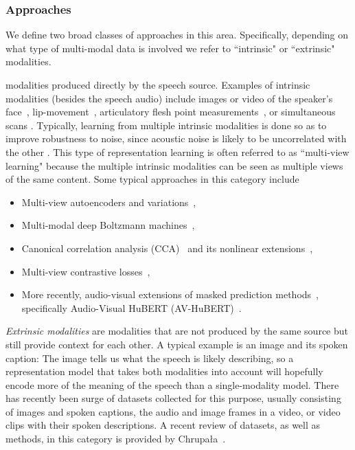 \subsubsection{Approaches}
We define two broad classes of approaches in this area. Specifically, depending on what type of multi-modal data is involved we refer to ``intrinsic" or ``extrinsic" modalities.

modalities produced directly by the speech source.  Examples of intrinsic modalities (besides the speech audio) include images or video of the speaker's face~\parencite{lee_avicar_2004,chung_lip_2016}, lip-movement~\parencite{shi_learning_2022}, articulatory flesh point measurements~\parencite{westbury_xray_1990,wrench_new_2001}, or simultaneous  scans \parencite{narayanan_multimodal_2011}.  Typically, learning from multiple intrinsic modalities is done so as to improve robustness to noise, since acoustic noise is likely to be uncorrelated with the other .  This type of representation learning is often referred to as ``multi-view learning" because the multiple intrinsic modalities can be seen as multiple views of the same content. Some typical approaches in this category include
\begin{itemize}
    \item Multi-view autoencoders and variations~\parencite{ngiam_multimodal_2011,badino_integrating_2016},
    \item Multi-modal deep Boltzmann machines~\parencite{srivastava_multimodal_2012},
    \item Canonical correlation analysis (CCA)~\parencite{hotelling_relations_1936} and its nonlinear extensions~\parencite{andrew_deep_2013,wang_deep_2015,wang_deep_2016,michaeli_nonparametric_2016,melzer_nonlinear_2001,lai_kernel_2000,lai_neural_1999,bach_probabilistic_2005,wang_unsupervised_2015},
    \item Multi-view contrastive losses~\parencite{hermann_multilingual_2013,huang_learning_2013},
    \item More recently, audio-visual extensions of masked prediction methods~\parencite{shi_learning_2022,shi_robust_2022}, specifically Audio-Visual HuBERT (AV-HuBERT)~\parencite{shi_learning_2022}.
\end{itemize}

\textit{Extrinsic modalities} are modalities that are not produced by the same source but still provide context for each other. A typical example is an image and its spoken caption: The image tells us what the speech is likely describing, so a representation model that takes both modalities into account will hopefully encode more of the meaning of the speech than a single-modality model. 
There has recently been  surge of datasets collected for this purpose, usually consisting of images and spoken captions, the audio and image frames in a video, or video clips with their spoken descriptions. A recent review of datasets, as well as methods, in this category is provided by Chrupa\l{}a~\parencite{chrupala_visually_2021}. 


